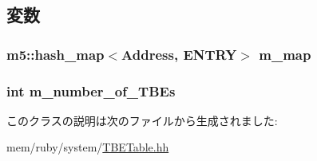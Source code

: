 \subsection{変数}
\hypertarget{classTBETable_a417c02484273117796b838cfc46fa2db}{
\subsubsection[{m\_\-map}]{\setlength{\rightskip}{0pt plus 5cm}m5::hash\_\-map$<${\bf Address}, ENTRY$>$ {\bf m\_\-map}}}
\label{classTBETable_a417c02484273117796b838cfc46fa2db}
\hypertarget{classTBETable_a9fe046cc3878d0da925915f0f90ab8c2}{
\subsubsection[{m\_\-number\_\-of\_\-TBEs}]{\setlength{\rightskip}{0pt plus 5cm}int {\bf m\_\-number\_\-of\_\-TBEs}}}
\label{classTBETable_a9fe046cc3878d0da925915f0f90ab8c2}


このクラスの説明は次のファイルから生成されました:\begin{DoxyCompactItemize}
\item 
mem/ruby/system/\hyperlink{TBETable_8hh}{TBETable.hh}\end{DoxyCompactItemize}
